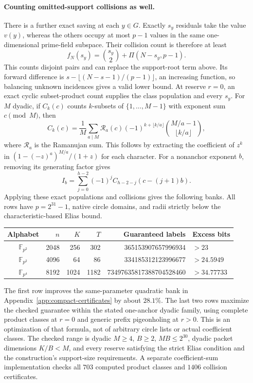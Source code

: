 \paragraph{Counting omitted-support collisions as well.}
There is a further exact saving at each $y\in G$. Exactly $s_y$ residuals
take the value $v(y)$, whereas the others occupy at most $p-1$ values
in the same one-dimensional prime-field subspace. Their collision count
is therefore at least
\[
 f_N(s_y)=\binom{s_y}{2}+\Pi(N-s_y,p-1).
\]
This counts disjoint pairs and can replace the support-root term above.
Its forward difference is
$s-\lfloor(N-s-1)/(p-1)\rfloor$, an increasing function, so balancing
unknown incidences gives a valid lower bound. At reserve $r=0$, an exact
cyclic subset-product count supplies the class population and every $s_y$.
For $M$ dyadic, if $C_k(c)$ counts $k$-subsets of $\{1,\ldots,M-1\}$
with exponent sum $c\pmod M$, then
\[
 C_k(c)=\frac1M\sum_{a\mid M}\mathcal R_a(c)
 (-1)^{k+\lfloor k/a\rfloor}\binom{M/a-1}{\lfloor k/a\rfloor},
\]
where $\mathcal R_a$ is the Ramanujan sum. This follows by extracting the
coefficient of $z^k$ in $(1-(-z)^a)^{M/a}/(1+z)$ for each character.
For a nonanchor exponent $b$, removing its generating factor gives
\[
 I_b=\sum_{j=0}^{h-2}(-1)^j C_{h-2-j}(c-(j+1)b).
\]
Applying these exact populations and collisions gives the following banks.
All rows have $p=2^{31}-1$, native circle domains, and radii strictly below
the characteristic-based Elias bound.
\begin{center}
\begin{tabular}{crrrrl}
\toprule
Alphabet & $n$ & $K$ & $T$ & Guaranteed labels & Excess bits\\
\midrule
$\mathbb F_{p^2}$ &2048&256&302&365153907657996934&$>23$\\
$\mathbb F_{p^2}$ &4096&64&86&334185312123996677&$>24.5949$\\
$\mathbb F_{p^4}$ &8192&1024&1182&73497635817388704528460&$>34.77733$\\
\bottomrule
\end{tabular}
\end{center}
The first row improves the same-parameter quadratic bank in
Appendix~\ref{app:compact-certificates} by about $28.1\%$.
The last two rows maximize the checked guarantee within the stated
one-anchor dyadic family, using complete product classes at $r=0$ and
generic prefix pigeonholing at $r>0$. This is an optimization of that
formula, not of arbitrary circle lists or actual coefficient classes.
The checked range is dyadic $M\ge4$, $B\ge2$, $MB\le2^{30}$,
dyadic packet dimensions $K/B<M$, and every reserve satisfying the
strict Elias condition and the construction's support-size requirements.
A separate coefficient-sum implementation checks all $703$ computed
product classes and $1406$ collision certificates.


